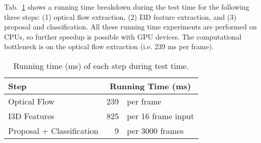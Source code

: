\documentclass[10pt,twocolumn,letterpaper]{article}
\newcommand\Tstrut{\rule{0pt}{2.2ex}}       \newcommand\Bstrut{\rule[-1.0ex]{0pt}{0pt}} \newcommand{\TBstrut}{\Tstrut\Bstrut}
\begin{document}
Tab.~\ref{tab:time} shows a running time breakdown during the test time for the
following three steps: (1) optical flow extraction, (2) I3D feature extraction,
and (3) proposal and classification. All these running time experiments are
performed on CPUs, so further speedup is possible with GPU devices. The
computational bottleneck is on the optical flow extraction (i.e. 239 ms per
frame).

\begin{table}[t]
\centering
  \begin{tabular}{l||rl}
  \hline \TBstrut
  Step                      & \multicolumn{2}{c}{Running Time (ms)} \\
  \hline \Tstrut
  Optical Flow              &  239 & per frame          \\ 
  I3D Features              &  825 & per 16 frame input \\ \Bstrut
  Proposal + Classification &  9   & per 3000 frames    \\
  \hline
 \end{tabular}
 \vspace{-2mm}
 \caption{\small Running time (ms) of each step during test time.}
\label{tab:time}
\end{table}
\end{document}
